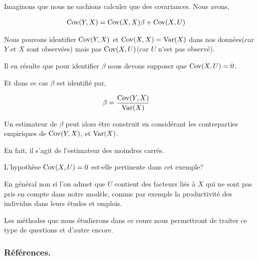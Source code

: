 \begin{frame}[allowframebreaks]
\medskip

Imaginons que nous ne sachions calculer que des covariances. Nous
avons,

\begin{align*}
\mathrm{Cov}(Y, X) &= \mathrm{Cov}(X, X)\beta + \mathrm{Cov}(X, U)
\end{align*}

Nous pouvons identifier $\mathrm{Cov}(Y, X)$ et $\mathrm{Cov}(X, X) = \mathrm{Var}(X)$ dans
nos données(car $Y$ et $X$ sont observées) mais pas $\mathrm{Cov}(X, U)$(car
$U$ n'est pas observé).

\medskip

Il en résulte que pour identifier $\beta$ nous devons supposer que
$\mathrm{Cov}(X, U)= 0$.

\medskip

Et dans ce cas $\beta$ est identifié par,

\begin{align*}
\beta &= \frac{\mathrm{Cov}(Y, X)}{\mathrm{Var}(X)}
\end{align*}

Un estimateur de $\beta$ peut alors être construit en considérant les
contreparties empiriques de $\mathrm{Cov}(Y, X)$, et $\mathrm{Var}(X)$.

\medskip

En fait, il s'agit de l'estimateur des moindres carrés.

\medskip

L'hypothèse $\mathrm{Cov}(X, U)= 0$ est-elle pertinente dans cet exemple?

\medskip

En général non si l'on admet que $U$ contient des facteurs liés à $X$
qui ne sont pas pris en compte dans notre modèle, comme par exemple la
productivité des individus dans leurs études et emplois.

\medskip

Les méthodes que nous étudierons dans ce cours nous permettront de
traiter ce type de questions et d'autre encore.

\end{frame}


\begin{frame}[allowframebreaks]\frametitle{Références.}




\end{frame}

